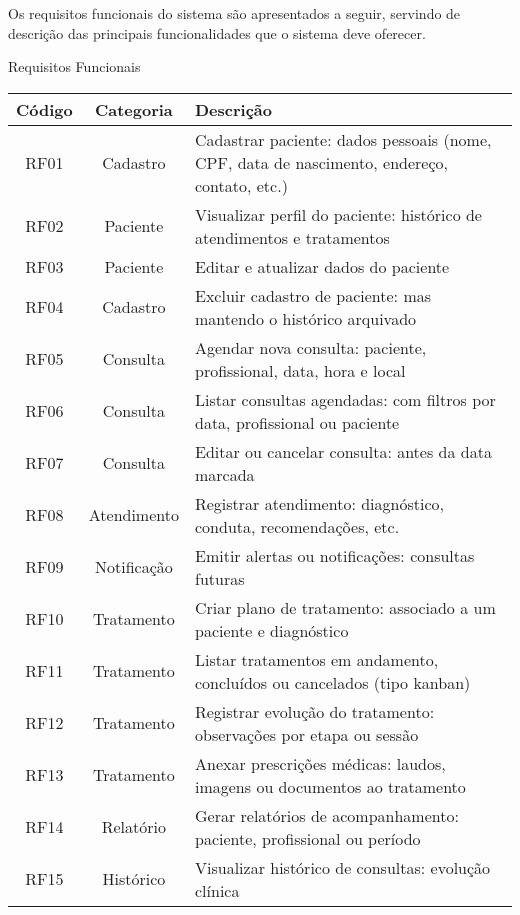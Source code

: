 Os requisitos funcionais do sistema são apresentados a seguir, servindo de descrição das principais funcionalidades que o sistema deve oferecer.

\begin{quadro}
    \caption{\label{quadro_requisitos_f}Requisitos Funcionais}
    \begin{tabular}{|c|c|p{10cm}|}
        \hline
        \textbf{Código} & \textbf{Categoria} & \textbf{Descrição} \\ \hline
        RF01   & Cadastro     & Cadastrar paciente: dados pessoais (nome, CPF, data de nascimento, endereço, contato, etc.) \\ \hline
        RF02   & Paciente     & Visualizar perfil do paciente: histórico de atendimentos e tratamentos \\ \hline
        RF03   & Paciente     & Editar e atualizar dados do paciente \\ \hline
        RF04   & Cadastro     & Excluir cadastro de paciente: mas mantendo o histórico arquivado \\ \hline
        RF05   & Consulta     & Agendar nova consulta: paciente, profissional, data, hora e local \\ \hline
        RF06   & Consulta     & Listar consultas agendadas: com filtros por data, profissional ou paciente \\ \hline
        RF07   & Consulta     & Editar ou cancelar consulta: antes da data marcada \\ \hline
        RF08   & Atendimento  & Registrar atendimento: diagnóstico, conduta, recomendações, etc. \\ \hline
        RF09   & Notificação  & Emitir alertas ou notificações: consultas futuras \\ \hline
        RF10   & Tratamento   & Criar plano de tratamento: associado a um paciente e diagnóstico \\ \hline
        RF11   & Tratamento   & Listar tratamentos em andamento, concluídos ou cancelados (tipo kanban) \\ \hline
        RF12   & Tratamento   & Registrar evolução do tratamento: observações por etapa ou sessão \\ \hline
        RF13   & Tratamento   & Anexar prescrições médicas: laudos, imagens ou documentos ao tratamento \\ \hline
        RF14   & Relatório    & Gerar relatórios de acompanhamento: paciente, profissional ou período \\ \hline
        RF15   & Histórico    & Visualizar histórico de consultas: evolução clínica \\ \hline

\end{tabular}
\end{quadro}
